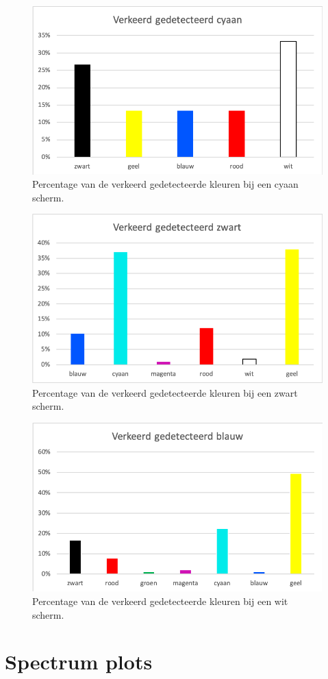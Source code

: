 \documentclass[a4paper,11pt]{article}
\begin{document}
		\bigskip	
		\begin{figure} [H]
			\center
			\includegraphics{img/WrongBlueGreen}
			\caption{Percentage van de verkeerd gedetecteerde kleuren bij een cyaan scherm.}
		\end{figure}
	\bigskip		
		\begin{figure} [H]
			\center
			\includegraphics{img/WrongBlack}
			\caption{Percentage van de verkeerd gedetecteerde kleuren bij een zwart scherm.}
		\end{figure}
	\bigskip		
		\begin{figure} [H]
			\center
			\includegraphics{img/WrongWhite}
			\caption{Percentage van de verkeerd gedetecteerde kleuren bij een wit scherm.}
		\end{figure}
\section{Spectrum plots}

\newpage
{}


\end{document}
